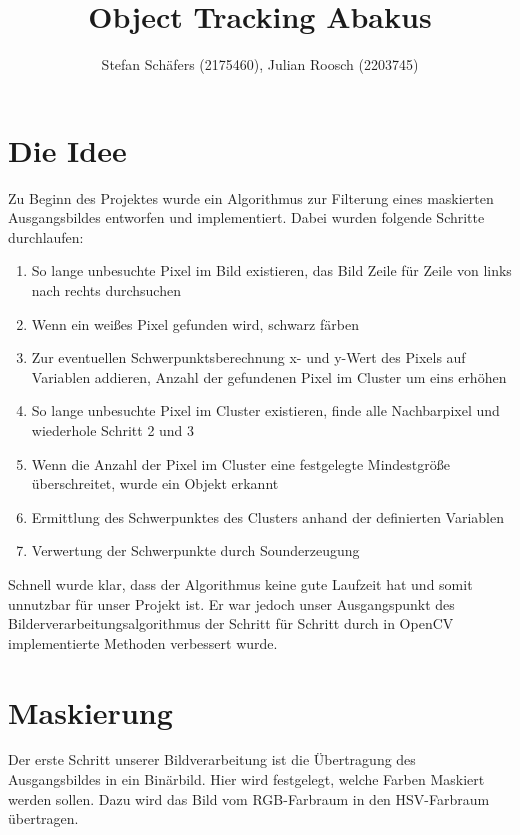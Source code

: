 \documentclass[12pt]{article}
\title{Object Tracking Abakus}
\author{Stefan Schäfers (2175460), Julian Roosch (2203745)}
\begin{document}
\maketitle
\section{Die Idee}
Zu Beginn des Projektes wurde ein Algorithmus zur Filterung eines maskierten Ausgangsbildes entworfen und implementiert. Dabei wurden folgende Schritte durchlaufen:
\begin{enumerate}
\item So lange unbesuchte Pixel im Bild existieren, das Bild Zeile für Zeile von links nach rechts durchsuchen
\item Wenn ein weißes Pixel gefunden wird, schwarz färben
\item Zur eventuellen Schwerpunktsberechnung x- und y-Wert des Pixels auf Variablen addieren, Anzahl der gefundenen Pixel im Cluster um eins erhöhen
\item So lange unbesuchte Pixel im Cluster existieren, finde alle Nachbarpixel und wiederhole Schritt 2 und 3
\item Wenn die Anzahl der Pixel im Cluster eine festgelegte Mindestgröße überschreitet, wurde ein Objekt erkannt
\item Ermittlung des Schwerpunktes des Clusters anhand der definierten Variablen
\item Verwertung der Schwerpunkte durch Sounderzeugung
\end{enumerate}

Schnell wurde klar, dass der Algorithmus keine gute Laufzeit hat und somit unnutzbar für unser Projekt ist. Er war jedoch unser Ausgangspunkt des Bilderverarbeitungsalgorithmus der Schritt für Schritt durch in OpenCV implementierte Methoden verbessert wurde.
\section{Maskierung}
Der erste Schritt unserer Bildverarbeitung ist die Übertragung des Ausgangsbildes in ein Binärbild. Hier wird festgelegt, welche Farben Maskiert werden sollen. Dazu wird das Bild vom RGB-Farbraum in den HSV-Farbraum übertragen. 
\end{document}
